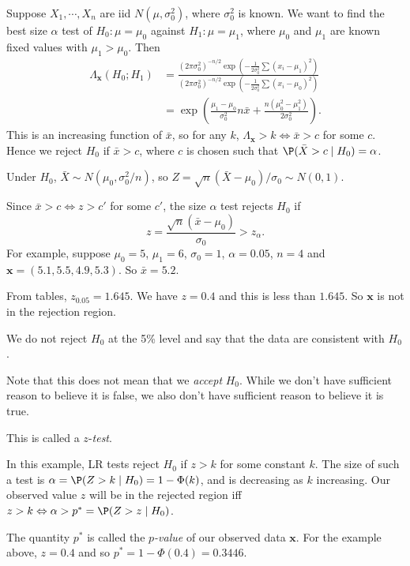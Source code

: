 \documentclass[a4paper]{article}
\begin{document}
\begin{eg}
  Suppose $X_1, \cdots, X_n$ are iid $N(\mu, \sigma_0^2)$, where $\sigma_0^2$ is known. We want to find the best size $\alpha$ test of $H_0: \mu = \mu_0$ against $H_1: \mu = \mu_1$, where $\mu_0$ and $\mu_1$ are known fixed values with $\mu_1 > \mu_0$. Then
  \begin{align*}
    \Lambda_\mathbf{x}(H_0; H_1) &= \frac{(2\pi\sigma_0^2)^{-n/2}\exp\left(-\frac{1}{2\sigma^2_0}\sum(x_i - \mu_1)^2\right)}{(2\pi\sigma_0^2)^{-n/2}\exp\left(-\frac{1}{2\sigma^2_0}\sum(x_i - \mu_0)^2\right)}\\
    &= \exp\left(\frac{\mu_1 - \mu_0}{\sigma_0^2}n\bar x + \frac{n(\mu_0^2 - \mu_1^2)}{2\sigma_0^2}\right).
  \end{align*}
  This is an increasing function of $\bar x$, so for any $k$, $\Lambda_\mathbf{x} > k\Leftrightarrow \bar x > c$ for some $c$. Hence we reject $H_0$ if $\bar x > c$, where $c$ is chosen such that $\P(\bar X > c \mid H_0) = \alpha$.

  Under $H_0$, $\bar X \sim N(\mu_0, \sigma_0^2/n)$, so $Z = \sqrt{n}(\bar X - \mu_0)/\sigma_0 \sim N(0, 1)$.

  Since $\bar x > c\Leftrightarrow z > c'$ for some $c'$, the size $\alpha$ test rejects $H_0$ if
  \[
    z = \frac{\sqrt{n}(\bar x - \mu_0)}{\sigma_0} > z_\alpha.
  \]
  For example, suppose $\mu_0 = 5$, $\mu_1 = 6$, $\sigma_0 = 1$, $\alpha = 0.05$, $n = 4$ and $\mathbf{x} = (5.1, 5.5, 4.9, 5.3)$. So $\bar x = 5.2$.

  From tables, $z_{0.05} = 1.645$. We have $z = 0.4$ and this is less than $1.645$. So $\mathbf{x}$ is not in the rejection region.

  We do not reject $H_0$ at the 5\% level and say that the data are consistent with $H_0$.

  Note that this does not mean that we \emph{accept} $H_0$. While we don't have sufficient reason to believe it is false, we also don't have sufficient reason to believe it is true.

  This is called a $z$-\emph{test}.
\end{eg}

In this example, LR tests reject $H_0$ if $z > k$ for some constant $k$. The size of such a test is $\alpha = \P(Z > k\mid H_0) = 1 - \Phi(k)$, and is decreasing as $k$ increasing.
Our observed value $z$ will be in the rejected region iff $z > k \Leftrightarrow \alpha > p^* = \P(Z > z\mid H_0)$.
\begin{defi}[$p$-value]
  The quantity $p^*$ is called the \emph{$p$-value} of our observed data $\mathbf{x}$. For the example above, $z = 0.4$ and so $p^* = 1 - \Phi(0.4) = 0.3446$.
\end{defi}
\end{document}
